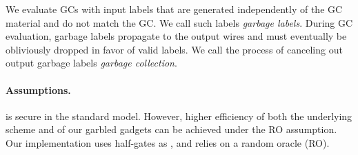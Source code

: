 We evaluate GCs  with input labels that are generated independently of the GC material and do not match the GC.
We call such labels {\em garbage labels}.
During GC evaluation,  garbage labels propagate to the output wires and must eventually  be obliviously dropped in favor of valid labels.
We call the process of canceling out output garbage labels {\em garbage collection}.

\paragraph{Assumptions.}  
\ourschemelong is secure in the standard model. However, higher
efficiency of both the underlying scheme \underscheme and of our
garbled gadgets can be achieved under the RO assumption.  Our
implementation uses half-gates as \underscheme, and relies on a random oracle (RO).


